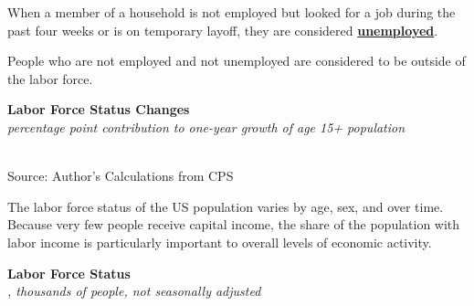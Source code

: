 \documentclass{report}
\makeatletter
\newcommand{\tbllink}[1]{\href{https://raw.githubusercontent.com/bdecon/US-chartbook/master/chartbook/data/#1}{\faTable}}
\newcommand*\short[1]{\expandafter\@gobbletwo\number\numexpr#1\relax}
\newcommand{\ctsbar}[5]{
		\addplot[ybar stacked, bar width=#5, draw opacity=0, fill=#1] 
			table [x=#2, y=#3, col sep=comma]{#4};}
\newcommand{\dateaxisticks}{
		date coordinates in=x, axis line style={draw=none},
		xmax={2021-05-15},
		max space between ticks=40,	    
		xtick={{1990-01-01}, {1992-01-01}, {1994-01-01}, 
			{1996-01-01}, {1998-01-01}, {2000-01-01}, 
			{2002-01-01}, {2004-01-01}, {2006-01-01},
			{2008-01-01}, {2010-01-01}, {2012-01-01}, {2014-01-01},
		    {2016-01-01}, {2018-01-01}, {2020-01-01}},
		minor xtick={{1989-01-01}, {1991-01-01}, {1993-01-01},
			{1995-01-01}, {1997-01-01}, {1999-01-01}, 
			{2001-01-01}, {2003-01-01}, {2005-01-01}, {2007-01-01},
		    {2009-01-01}, {2011-01-01}, {2013-01-01}, {2015-01-01},
		    {2017-01-01}, {2019-01-01}, {2021-01-01}},
		enlarge y limits={0.06}, enlarge x limits={0.01},
		}
\newcommand{\bbar}[2]{extra #1 ticks = {{#2}}, extra #1 tick labels = ,
		extra #1 tick style = {grid=major, grid style={thick, black!25}},}
\newcommand{\rbars}{
		\fill[color=black!10] (axis cs:{1990-07-01},\pgfkeysvalueof{/pgfplots/ymin}) rectangle 
			(axis cs:{1991-03-01}, \pgfkeysvalueof{/pgfplots/ymax});
		\fill[color=black!10] (axis cs:{2007-12-01},\pgfkeysvalueof{/pgfplots/ymin}) rectangle 
			(axis cs:{2009-07-01}, \pgfkeysvalueof{/pgfplots/ymax});
		\fill[color=black!10] (axis cs:{2001-03-01},\pgfkeysvalueof{/pgfplots/ymin}) rectangle 
			(axis cs:{2001-11-01}, \pgfkeysvalueof{/pgfplots/ymax});
		\fill[color=black!10] (axis cs:{2020-02-01},\pgfkeysvalueof{/pgfplots/ymin}) rectangle 
			(axis cs:{2021-05-15}, \pgfkeysvalueof{/pgfplots/ymax});}
\makeatother
\begin{document}
{\begin{minipage}{0.76\textwidth}
\small When a member of a household is not employed but looked for a job during the past four weeks or is on temporary layoff, they are considered \href{https://www.bls.gov/cps/cps_htgm.htm}{\textbf{unemployed}}. 

People who are not employed and not unemployed are considered to be outside of the labor force.  
\vspace{2mm}

\normalsize \textbf{Labor Force Status Changes}\\
\footnotesize{\textit{percentage point contribution to one-year growth of age 15+ population}}\\
\hspace*{-2mm} \\
\footnotesize{Source: Author's Calculations from CPS} \hfill \tbllink{cps_lfs2.csv}
\end{minipage}
\newpage
\begin{minipage}{0.76\textwidth}
\small The labor force status of the US population varies by age, sex, and over time. Because very few people receive capital income, the share of the population with labor income is particularly important to overall levels of economic activity. 
\vspace{1mm}

\normalsize \textbf{Labor Force Status}\\
\footnotesize{\textit{\unskip, thousands of people, not seasonally adjusted}}\\
\noindent {} \setlength{\tabcolsep}{3.0pt} \color{black!90}
		{\renewcommand{\arraystretch}{1.52}
		 \begin{tabular}{p{27.8mm} R{11.2mm} R{10.4mm} R{10.4mm} R{10.2mm} 
		 				 R{10.6mm} R{10.4mm} R{10.4mm}}
			  \hline
		\end{tabular}}
\vspace{-2mm}	
	

\end{minipage}}
\end{document}
